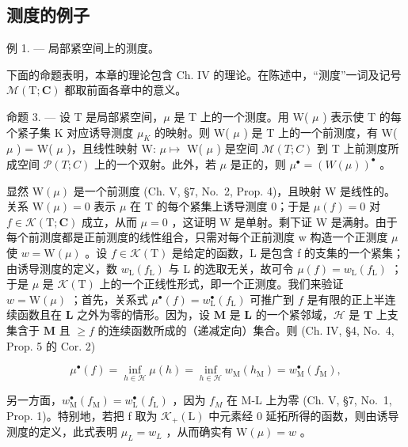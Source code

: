 \subsection{测度的例子}

例 1. --- 局部紧空间上的测度。

下面的命题表明，本章的理论包含 Ch. IV 的理论。在陈述中，“测度”一词及记号 \(\mathcal{M}(\mathrm{T};\mathbf{C})\) 都取前面各章中的意义。

命题 3. --- 设 T 是局部紧空间，\(\mu\) 是 T 上的一个测度。用 W( \(\mu\) ) 表示使 T 的每个紧子集 K 对应诱导测度 \(\mu_{K}\) 的映射。则 W( \(\mu\) ) 是 T 上的一个前测度，有 W(\textbar{} \(\mu\) \textbar) = \textbar W( \(\mu\) )\textbar，且线性映射 W: \(\mu \mapsto\) W( \(\mu\) ) 是空间 \(\mathcal{M}(T;C)\) 到 T 上前测度所成空间 \(\mathcal{P}(T;C)\) 上的一个双射。此外，若 \(\mu\) 是正的，则 \(\mu^{\bullet} = (W(\mu))^{\bullet}\) 。

显然 \(\mathrm{W}(\mu)\) 是一个前测度 (Ch. V, §7, No.~2, Prop. 4)，且映射 W 是线性的。关系 \(\mathrm{W}(\mu)=0\) 表示 \(\mu\) 在 T 的每个紧集上诱导测度 0；于是 \(\mu(f)=0\) 对 \(f\in\mathcal{K}(\mathrm{T};\mathbf{C})\) 成立，从而 \(\mu=0\) ，这证明 W 是单射。剩下证 W 是满射。由于每个前测度都是正前测度的线性组合，只需对每个正前测度 w 构造一个正测度 \(\mu\) 使 \(w=\mathrm{W}(\mu)\) 。设 \(f\in\mathcal{K}(\mathrm{T})\) 是给定的函数，L 是包含 f 的支集的一个紧集；由诱导测度的定义，数 \(w_{\mathrm{L}}(f_{\mathrm{L}})\) 与 L 的选取无关，故可令 \(\mu(f)=w_{\mathrm{L}}(f_{\mathrm{L}})\) ；于是 \(\mu\) 是 \(\mathcal{K}(\mathrm{T})\) 上的一个正线性形式，即一个正测度。我们来验证 \(w = \mathrm{W}(\mu)\) ；首先，关系式 \(\mu^{\bullet}(f) = w_{\mathrm{L}}^{\bullet}(f_{\mathrm{L}})\) 可推广到 \(f\) 是有限的正上半连续函数且在 \(\mathbf{L}\) 之外为零的情形。因为，设 \(\mathbf{M}\) 是 \(\mathbf{L}\) 的一个紧邻域，\(\mathcal{H}\) 是 \(\mathbf{T}\) 上支集含于 \(\mathbf{M}\) 且 \(\geqslant f\) 的连续函数所成的（递减定向）集合。则 (Ch. IV, §4, No.~4, Prop. 5 的 Cor. 2)

\[
\mu^ {\bullet} (f) = \inf _ {h \in \mathscr {H}} \mu (h) = \inf _ {h \in \mathscr {H}} w _ {\mathrm{M}} (h _ {\mathrm{M}}) = w _ {\mathrm{M}} ^ {\bullet} (f _ {\mathrm{M}}),
\]

另一方面，\(w_{\mathrm{M}}^{\bullet}(f_{\mathrm{M}}) = w_{\mathrm{L}}^{\bullet}(f_{\mathrm{L}})\) ，因为 \(f_{M}\) 在 M-L 上为零 (Ch. V, §7, No.~1, Prop. 1)。特别地，若把 f 取为 \(\mathcal{K}_{+}(\mathrm{L})\) 中元素经 0 延拓所得的函数，则由诱导测度的定义，此式表明 \(\mu_{L} = w_{L}\) ，从而确实有 \(\mathrm{W}(\mu) = w\) 。

